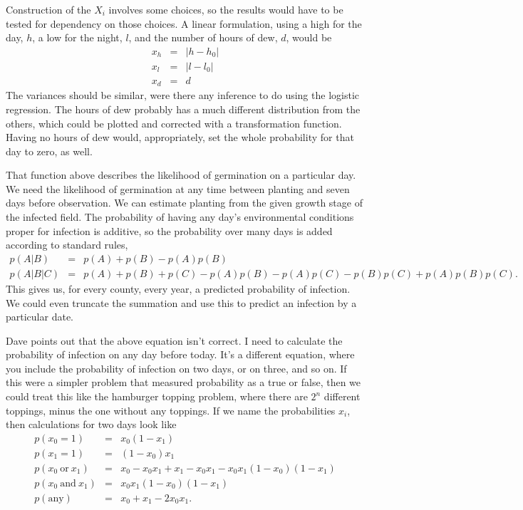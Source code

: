 \documentclass{article}
\begin{document}
Construction of the $X_i$ involves some choices, so the results would have to be tested for dependency on those choices. A linear formulation, using a high for the day, $h$, a low for the night, $l$, and the number of hours of dew, $d$, would be
\begin{eqnarray}
	x_h & = & |h-h_0| \\
	x_l & = & |l-l_0| \\
	x_d & = & d
\end{eqnarray}
The variances should be similar, were there any inference to do using the logistic regression.
The hours of dew probably has a much different distribution from the others, which could be
plotted and corrected with a transformation function. Having no hours of dew would, appropriately, set the whole probability for that day to zero, as well.

That function above describes the likelihood of germination on a particular day. We need the likelihood of germination at any time between planting and seven days before observation. We can estimate planting from the given growth stage of the infected field.  The probability of having any day's environmental conditions proper for infection is additive, so the probability over
many days is added according to standard rules,
\begin{eqnarray}
	p(A|B) & = & p(A)+p(B)-p(A)p(B) \\
	p(A|B|C) & = & p(A)+p(B) + p(C) -p(A)p(B) -p(A)p(C) -p(B)p(C) +p(A)p(B)p(C).
\end{eqnarray}
This gives us, for every county, every year, a predicted probability of infection. We could even truncate the summation and use this to predict an infection by a particular date.

Dave points out that the above equation isn't correct. I need to calculate the probability of
infection on any day before today. It's a different equation, where you include the probability
of infection on two days, or on three, and so on. If this were a simpler problem that 
measured probability as a true or false, then we could treat this like the hamburger topping problem, where there are $2^n$ different toppings, minus the one without any toppings.
If we name the probabilities $x_i$, then calculations for two days look like
\begin{eqnarray}
  p(x_0=1) & = & x_0(1-x_1) \\
  p(x_1=1) & = & (1-x_0)x_1 \\
  p(x_0\:\mbox{or}\:x_1) & = & x_0-x_0x_1+x_1-x_0x_1 - x_0x_1(1-x_0)(1-x_1) \\
  p(x_0\:\mbox{and}\:x_1) & = & x_0x_1(1-x_0)(1-x_1) \\
  p(\mbox{any}) & = & x_0+x_1-2x_0x_1.
\end{eqnarray}
\end{document}

